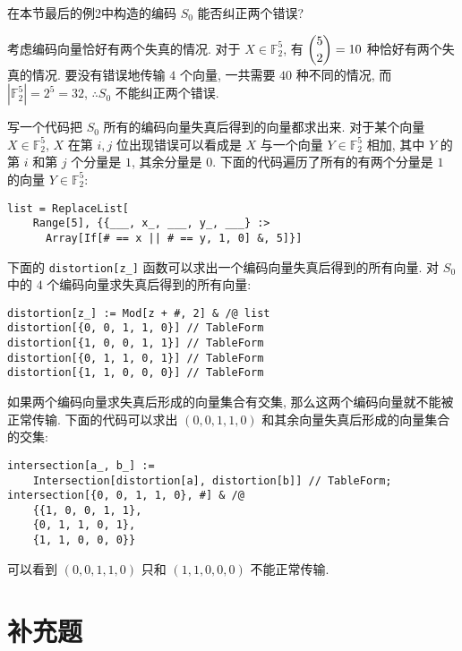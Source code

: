 \documentclass[color=black,device=normal,lang=cn,mode=geye]{elegantnote}
\begin{document}
\begin{exercise}%
    在本节最后的例2中构造的编码 $S_0$ 能否纠正两个错误?
\end{exercise}
\begin{solution}
    考虑编码向量恰好有两个失真的情况. 对于 $X\in \mathbb{F}_2^5$, 有 $\dbinom{5}{2}=10$ 种恰好有两个失真的情况. 要没有错误地传输 $4$ 个向量, 一共需要 $40$ 种不同的情况, 而 $|\mathbb{F}_2^5|=2^5=32$, $\therefore S_0$ 不能纠正两个错误.
\end{solution}
\begin{note}
    写一个代码把 $S_0$ 所有的编码向量失真后得到的向量都求出来. 对于某个向量 $X\in\mathbb{F}_2^5$, $X$ 在第 $i,j$ 位出现错误可以看成是 $X$ 与一个向量 $Y\in\mathbb{F}_2^5$ 相加, 其中 $Y$ 的第 $i$ 和第 $j$ 个分量是 $1$, 其余分量是 $0$. 下面的代码遍历了所有的有两个分量是 $1$ 的向量 $Y\in\mathbb{F}_2^5$:
    \begin{verbatim}
list = ReplaceList[
    Range[5], {{___, x_, ___, y_, ___} :> 
      Array[If[# == x || # == y, 1, 0] &, 5]}]\end{verbatim}

    下面的 \verb|distortion[z_]| 函数可以求出一个编码向量失真后得到的所有向量. 对 $S_0$ 中的 $4$ 个编码向量求失真后得到的所有向量:
    \begin{verbatim}
distortion[z_] := Mod[z + #, 2] & /@ list
distortion[{0, 0, 1, 1, 0}] // TableForm
distortion[{1, 0, 0, 1, 1}] // TableForm
distortion[{0, 1, 1, 0, 1}] // TableForm
distortion[{1, 1, 0, 0, 0}] // TableForm\end{verbatim}

    如果两个编码向量求失真后形成的向量集合有交集, 那么这两个编码向量就不能被正常传输. 下面的代码可以求出 $(0, 0, 1, 1, 0)$ 和其余向量失真后形成的向量集合的交集:
    \begin{verbatim}
intersection[a_, b_] :=
    Intersection[distortion[a], distortion[b]] // TableForm;
intersection[{0, 0, 1, 1, 0}, #] & /@
    {{1, 0, 0, 1, 1},
    {0, 1, 1, 0, 1},
    {1, 1, 0, 0, 0}}\end{verbatim}

    可以看到 $(0, 0, 1, 1, 0)$ 只和 $(1, 1, 0, 0, 0)$ 不能正常传输.
\end{note}
\section{补充题}
\end{document}
